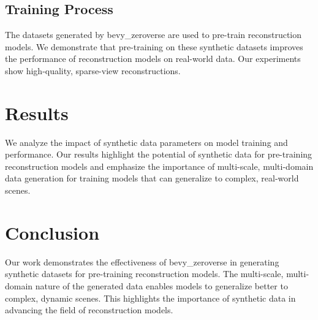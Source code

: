 \documentclass{article}
\begin{document}
\subsection{Training Process}
The datasets generated by bevy\_zeroverse are used to pre-train reconstruction models. We demonstrate that pre-training on these synthetic datasets improves the performance of reconstruction models on real-world data. Our experiments show high-quality, sparse-view reconstructions.

\section{Results}
We analyze the impact of synthetic data parameters on model training and performance. Our results highlight the potential of synthetic data for pre-training reconstruction models and emphasize the importance of multi-scale, multi-domain data generation for training models that can generalize to complex, real-world scenes.

\section{Conclusion}
Our work demonstrates the effectiveness of bevy\_zeroverse in generating synthetic datasets for pre-training reconstruction models. The multi-scale, multi-domain nature of the generated data enables models to generalize better to complex, dynamic scenes. This highlights the importance of synthetic data in advancing the field of reconstruction models.

\printbibliography
\end{document}
